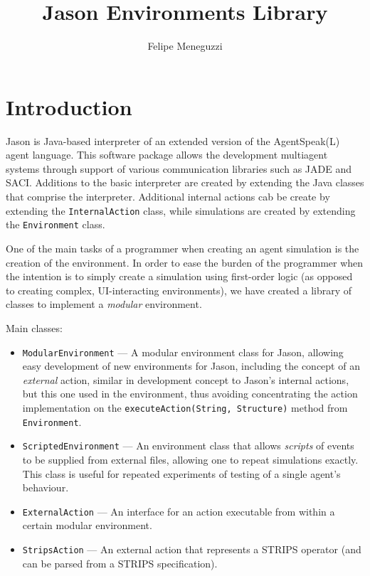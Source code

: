 \documentclass[a4paper]{report}
\title{Jason Environments Library}
\author{Felipe Meneguzzi}
\begin{document}
 
\maketitle

\chapter{Introduction}

Jason is Java-based interpreter of an extended version of the AgentSpeak(L)
agent language. 
This software package allows the development multiagent systems
through support of various communication libraries such as JADE and SACI. 
Additions to the basic interpreter are created by extending the Java classes
that comprise the interpreter. 
Additional internal actions cab be create by extending the
\texttt{InternalAction} class, while simulations are created by extending the
\texttt{Environment} class.

One of the main tasks of a programmer when creating an agent simulation is the
creation of the environment. 
In order to ease the burden of the programmer when the intention is to simply
create a simulation using first-order logic (as opposed to creating complex,
UI-interacting environments), we have created a library of classes to implement
a \emph{modular} environment.

Main classes:
\begin{itemize}
  \item \texttt{ModularEnvironment} ---  A modular environment class for Jason,
  allowing easy development of new environments for Jason, including the concept
  of an \emph{external} action, similar in development concept to Jason's
  internal actions, but this one used in the environment, thus avoiding
  concentrating the action implementation on the \texttt{executeAction(String,
  Structure)} method from \texttt{Environment}.
  \item \texttt{ScriptedEnvironment} --- An environment class that allows
  \emph{scripts} of events to be supplied from external files, allowing one to
  repeat simulations exactly. This class is useful for repeated experiments of
  testing of a single agent's behaviour.
  \item \texttt{ExternalAction} --- An interface for an action executable from
  within a certain modular environment.
  \item \texttt{StripsAction} --- An external action that represents a STRIPS
  operator (and can be parsed from a STRIPS specification).
\end{itemize}
\end{document}
